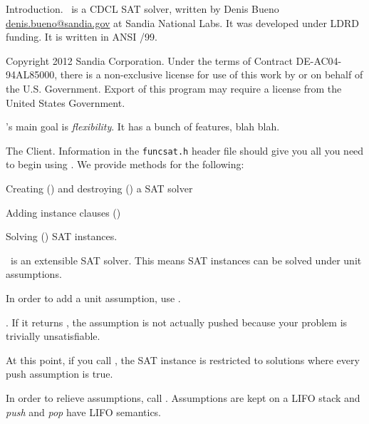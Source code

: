 Introduction.  \funcsat\ is a CDCL SAT solver, written by Denis Bueno
\url{denis.bueno@sandia.gov} at Sandia National Labs. It was developed under
LDRD funding. It is written in ANSI \CEE/99.

Copyright 2012 Sandia Corporation. Under the terms of Contract
DE-AC04-94AL85000, there is a non-exclusive license for use of this work by or
on behalf of the U.S. Government. Export of this program may require a license
from the United States Government.


\funcsat's main goal is {\it flexibility}. It has a bunch of features, blah
blah.

\Y\fi

The Client. Information in the {\tt funcsat.h} header file should give
you all you
need to begin using \funcsat. We provide methods for the following:

\numberedlist

\li Creating () and destroying () a
SAT solver

\li Adding instance clauses ()

\li Solving () SAT instances.

\endnumberedlist

\funcsat\ is an extensible SAT solver. This means SAT instances can be solved
under unit assumptions.

\numberedlist

\li In order to add a unit assumption, use .

. If it returns ,
the
assumption is not actually pushed because your problem is trivially
unsatisfiable.

\li At this point, if you call , the SAT instance is
restricted to
solutions where every push assumption is true.

\li In order to relieve assumptions, call .
Assumptions
are kept on a LIFO stack and {\it push} and {\it pop} have LIFO semantics.

\endnumberedlist

\fi

